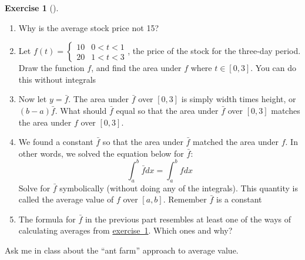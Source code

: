 \documentclass[10pt,]{book}
\theoremstyle{plain}
\theoremstyle{definition}
\theoremstyle{definition}
\theoremstyle{definition}
\theoremstyle{definition}
\newtheorem{exploration}[project]{Exercise}
\theoremstyle{definition}
\numberwithin{equation}{section}
\newcommand{\lt}{<}
\newcommand{\amp}{&}
\begin{document}
\begin{exploration}[]\label{exploration-213}
\leavevmode%
\begin{enumerate}[font=\bfseries,label=(\alph*),ref=\alph*]
\item\label{task-543} Why is the average stock price not \textdollar{}15?%
\item\label{task-544} Let \(f(t) = \begin{cases}10 \amp 0\lt t\lt 1\\20\amp 1\lt t\lt 3
\end{cases}\), the price of the stock for the three-day period. Draw the function \(f\), and find the area under \(f\) where \(t\in[0,3]\). You can do this without integrals%
%
\item\label{task-545} Now let \(y=\bar f\).  The area under \(\bar f\) over \([0,3]\) is simply width times height, or \((b-a)\bar f\). What should \(\bar f\) equal so that the area under \(\bar f\) over \([0,3]\) matches the area under \(f\) over \([0,3]\).%
\item\label{task-546} We found a constant \(\bar f\) so that the area under \(\bar f\) matched the area under \(f\). In other words, we solved the equation below for \(\bar f\):%
\begin{equation*}
\int_a^b \bar f dx = \int_a^b f dx
\end{equation*}
Solve for \(\bar f\) symbolically (without doing any of the integrals). This quantity is called the average value of \(f\) over \([a,b]\). Remember \(\bar{f}\) is a constant%
%
\item\label{task-547} The formula for \(\bar f\) in the previous part resembles at least one of the ways of calculating averages from \hyperref[average_value_methods]{exercise~1}.  Which ones and why?%
\end{enumerate}
\end{exploration}
Ask me in class about the ``ant farm'' approach to average value.%
\end{document}
